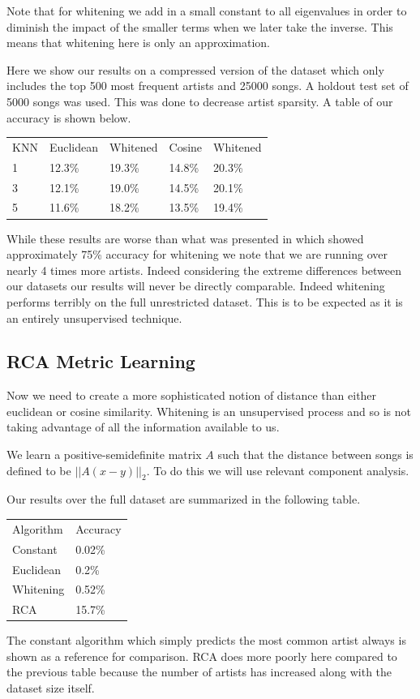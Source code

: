 \documentclass[a4paper,10pt]{article}
\begin{document}
Note that for whitening we add in a small constant to all eigenvalues in order to diminish the impact of the smaller terms when we later take the inverse. This means that whitening here is only an approximation. 

Here we show our results on a compressed version of the dataset which only includes the top 500 most frequent artists and 25000 songs. A holdout test set of 5000 songs was used. This was done to decrease artist sparsity. A table of our accuracy is shown below.
\begin{center}
\begin{tabular}{lllll}
KNN & Euclidean & Whitened & Cosine & Whitened\\
1 & 12.3\% & 19.3\% & 14.8\% & 20.3\%\\
3 & 12.1\% & 19.0\% & 14.5\% & 20.1\% \\
5 & 11.6\% & 18.2\% & 13.5\% & 19.4\% 
\end{tabular}
\end{center}
While these results are worse than what was presented in \cite{Slaney_learninga} which showed approximately 75\% accuracy for whitening we note that we are running over nearly 4 times more artists. Indeed considering the extreme differences between our datasets our results will never be directly comparable. Indeed whitening performs terribly on the full unrestricted dataset. This is to be expected as it is an entirely unsupervised technique.
\subsection{RCA Metric Learning}
Now we need to create a more sophisticated notion of distance than either euclidean or cosine similarity. Whitening is an unsupervised process and so is not taking advantage of all the information available to us. 

We learn a positive-semidefinite matrix $A$ such that the distance between songs is defined to be $||A(x-y)||_2$. To do this we will use relevant component analysis.



Our results over the full dataset are summarized in the following table.

\begin{center}
\begin{tabular}{ll}
Algorithm & Accuracy \\
Constant & 0.02\% \\
Euclidean & 0.2\% \\
Whitening & 0.52\% \\
RCA & 15.7\%
\end{tabular}
\end{center}
The constant algorithm which simply predicts the most common artist always is shown as a reference for comparison. RCA does more poorly here compared to the previous table because the number of artists has increased along with the dataset size itself. 
\end{document}
